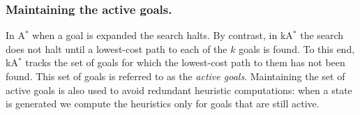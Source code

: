 \documentclass{aicom2e}
\newcommand{\astar}{A$^*$}
\newcommand{\kastar}{kA$^*$}
\newcommand{\open}{\textsc{Open}}
\begin{document}

\subsubsection*{Maintaining the active goals.}

In \astar{} when a goal is expanded the search halts. By contrast, in \kastar{}
the search does not halt until a lowest-cost path to each of the $k$ goals is
found. To this end, \kastar{} tracks the set of goals for which the lowest-cost
path to them has not been found. This set of goals is referred to as the {\em
active goals}. Maintaining the set of active goals is also used to avoid
redundant heuristic computations: when a state is generated we compute the
heuristics only for goals that are still active.



\end{document}
